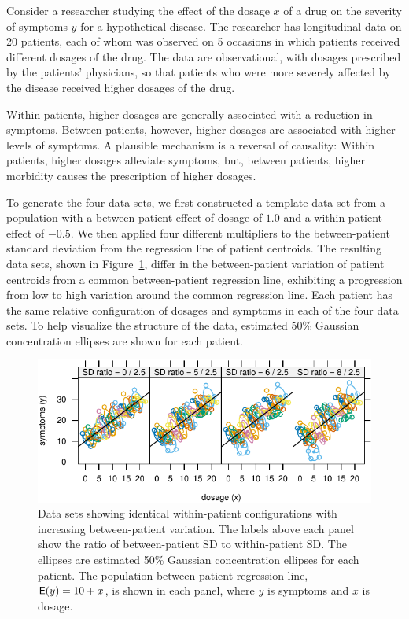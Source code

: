 \documentclass[
]{jss}
\begin{document}
Consider a researcher studying the effect of the dosage \(x\) of a drug
on the severity of symptoms \(y\) for a hypothetical disease. The
researcher has longitudinal data on 20 patients, each of whom was
observed on 5 occasions in which patients received different dosages of
the drug. The data are observational, with dosages prescribed by the
patients' physicians, so that patients who were more severely affected
by the disease received higher dosages of the drug.

Within patients, higher dosages are generally associated with a
reduction in symptoms. Between patients, however, higher dosages are
associated with higher levels of symptoms. A plausible mechanism is a
reversal of causality: Within patients, higher dosages alleviate
symptoms, but, between patients, higher morbidity causes the
prescription of higher dosages.

To generate the four data sets, we first constructed a template data set
from a population with a between-patient effect of dosage of \(1.0\) and
a within-patient effect of \(-0.5\). We then applied four different
multipliers to the between-patient standard deviation from the
regression line of patient centroids. The resulting data sets, shown in
Figure~\ref{fig:plot1}, differ in the between-patient variation of
patient centroids from a common between-patient regression line,
exhibiting a progression from low to high variation around the common
regression line. Each patient has the same relative configuration of
dosages and symptoms in each of the four data sets. To help visualize
the structure of the data, estimated 50\% Gaussian concentration
ellipses are shown for each patient.

\begin{CodeChunk}
\begin{figure}

{\centering \includegraphics[width=0.75\linewidth]{jss5535_files/figure-latex/plot1-1}

}

\caption[Data sets showing identical within-patient configurations with increasing between-patient variation]{Data sets showing identical within-patient configurations with increasing between-patient variation. The labels above each panel show the ratio of between-patient SD to within-patient SD. The ellipses are estimated 50\% Gaussian concentration ellipses for each patient. The population between-patient regression line, $\mathsf{E}(y) = 10 + x$, is shown in each panel, where $y$ is symptoms and $x$ is dosage.}\label{fig:plot1}
\end{figure}
\end{CodeChunk}
\end{document}
